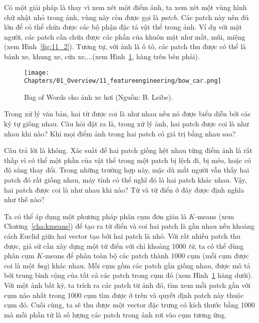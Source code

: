Có một giải pháp là thay vì xem xét một điểm ảnh, ta xem xét một vùng hình chữ
nhật nhỏ trong ảnh, vùng này còn được gọi là \textit{patch}. Các patch này nên
đủ lớn để có thể chứa được các bộ phận đặc tả vật thể trong ảnh. Ví dụ với mặt
người, các patch cần chứa được các phần của khuôn mặt như mắt, mũi, miệng (xem
Hình~\ref{fig:11_2}). Tương tự, với ảnh là ô tô, các patch thu được có thể là
bánh xe, khung xe, cửa xe,...(xem Hình~\ref{fig:11_3}, hàng trên bên phải).
\begin{figure}[t]
\centering
\texttt{[image: Chapters/01\_Overview/11\_featureengineering/bow\_car.png]}
\caption[]{Bag of Words cho ảnh xe hơi (Nguồn: B. Leibe).}
\label{fig:11_3}
\end{figure}

Trong xử lý văn bản, hai từ được coi là như nhau nếu nó được biểu diễn bởi các
ký tự giống nhau. Câu hỏi đặt ra là, trong xử lý ảnh, hai patch được coi là như
nhau khi nào? Khi mọi điểm ảnh trong hai patch có giá trị bằng nhau sao?

Câu trả lời là không. Xác suất để hai patch giống hệt nhau từng điểm ảnh là rất
thấp vì có thể một phần của vật thể trong một patch bị lệch đi, bị
méo, hoặc có độ sáng thay đổi. Trong những trường hợp này, mặc dù mắt người vẫn
thấy hai patch đó {rất giống nhau}, máy tính có thể nghĩ đó là hai patch
khác nhau. Vậy, hai patch được coi là như nhau khi nào? Từ và {từ điển} ở
đây được định nghĩa như thế nào?


Ta có thể áp dụng một phương pháp phân cụm đơn giản là $K$-means
(xem Chương~\ref{cha:kmeans}) để tạo ra từ điển và coi hai patch là gần nhau nếu
khoảng cách Euclid giữa hai vector tạo bởi hai patch là nhỏ. Với rất nhiều patch
thu được, giả sử cần xây dựng một từ điển với chỉ khoảng 1000 \textit{từ}, ta có
thể dùng phân cụm $K$-means để phân toàn bộ các patch thành 1000 cụm (mỗi
cụm được coi là một \textit{bag}) khác nhau. Mỗi cụm gồm các patch gần giống
nhau, được mô tả bởi trung bình cộng của tất cả các patch trong cụm đó (xem
Hình~\ref{fig:11_3} hàng dưới). Với một ảnh bất kỳ, ta trích ra các patch từ ảnh
đó, tìm xem mỗi patch gần với cụm nào nhất trong 1000 cụm tìm được ở trên và
quyết định patch này thuộc cụm đó. Cuối cùng, ta sẽ thu được một vector đặc
trưng có kích thước bằng 1000 mà mỗi phần tử là số lượng các patch trong ảnh rơi
vào cụm tương ứng.

